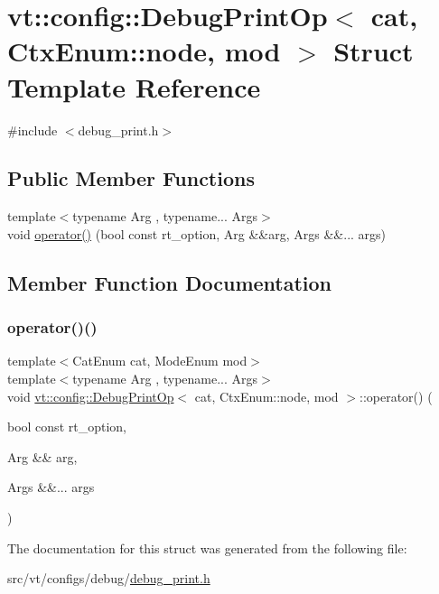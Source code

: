 \hypertarget{structvt_1_1config_1_1_debug_print_op_3_01cat_00_01_ctx_enum_1_1node_00_01mod_01_4}{}\section{vt\+:\+:config\+:\+:Debug\+Print\+Op$<$ cat, Ctx\+Enum\+:\+:node, mod $>$ Struct Template Reference}
\label{structvt_1_1config_1_1_debug_print_op_3_01cat_00_01_ctx_enum_1_1node_00_01mod_01_4}


{\ttfamily \#include $<$debug\+\_\+print.\+h$>$}

\subsection*{Public Member Functions}
\begin{DoxyCompactItemize}
\item 
{\footnotesize template$<$typename Arg , typename... Args$>$ }\\void \hyperlink{structvt_1_1config_1_1_debug_print_op_3_01cat_00_01_ctx_enum_1_1node_00_01mod_01_4_ae9d0f4ff11f556eaf0cf3cdfe16ed16d}{operator()} (bool const rt\+\_\+option, Arg \&\&arg, Args \&\&... args)
\end{DoxyCompactItemize}


\subsection{Member Function Documentation}
\mbox{\label{structvt_1_1config_1_1_debug_print_op_3_01cat_00_01_ctx_enum_1_1node_00_01mod_01_4_ae9d0f4ff11f556eaf0cf3cdfe16ed16d}} 
\subsubsection{\texorpdfstring{operator()()}{operator()()}}
{\footnotesize\ttfamily template$<$Cat\+Enum cat, Mode\+Enum mod$>$ \\
template$<$typename Arg , typename... Args$>$ \\
void \hyperlink{structvt_1_1config_1_1_debug_print_op}{vt\+::config\+::\+Debug\+Print\+Op}$<$ cat, Ctx\+Enum\+::node, mod $>$\+::operator() (\begin{DoxyParamCaption}\item[{bool const}]{rt\+\_\+option,  }\item[{Arg \&\&}]{arg,  }\item[{Args \&\&...}]{args }\end{DoxyParamCaption})\hspace{0.3cm}{\ttfamily [inline]}}



The documentation for this struct was generated from the following file\+:\begin{DoxyCompactItemize}
\item 
src/vt/configs/debug/\hyperlink{debug__print_8h}{debug\+\_\+print.\+h}\end{DoxyCompactItemize}
